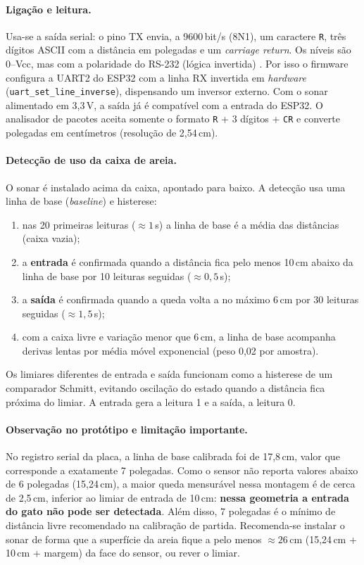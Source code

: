 \paragraph{Ligação e leitura.}
Usa-se a saída serial: o pino TX envia, a 9600\,bit/s (8N1), um caractere \texttt{R}, três dígitos ASCII com a distância em polegadas e um \textit{carriage return}. Os níveis são 0--Vcc, mas com a polaridade do RS-232 (lógica invertida) \citep{maxbotixez1}. Por isso o firmware configura a UART2 do ESP32 \citep{espidfuart} com a linha RX invertida em \textit{hardware} (\texttt{uart\_set\_line\_inverse}), dispensando um inversor externo. Com o sonar alimentado em 3,3\,V, a saída já é compatível com a entrada do ESP32. O analisador de pacotes aceita somente o formato \texttt{R} + 3 dígitos + \texttt{CR} e converte polegadas em centímetros (resolução de 2,54\,cm).

\paragraph{Detecção de uso da caixa de areia.}
O sonar é instalado acima da caixa, apontado para baixo. A detecção usa uma linha de base (\textit{baseline}) e histerese:
\begin{enumerate}
  \item nas 20 primeiras leituras ($\approx 1$\,s) a linha de base é a média das distâncias (caixa vazia);
  \item a \textbf{entrada} é confirmada quando a distância fica pelo menos 10\,cm abaixo da linha de base por 10 leituras seguidas ($\approx 0{,}5$\,s);
  \item a \textbf{saída} é confirmada quando a queda volta a no máximo 6\,cm por 30 leituras seguidas ($\approx 1{,}5$\,s);
  \item com a caixa livre e variação menor que 6\,cm, a linha de base acompanha derivas lentas por média móvel exponencial (peso 0,02 por amostra).
\end{enumerate}
Os limiares diferentes de entrada e saída funcionam como a histerese de um comparador Schmitt, evitando oscilação do estado quando a distância fica próxima do limiar. A entrada gera a leitura 1 e a saída, a leitura 0.

\paragraph{Observação no protótipo e limitação importante.}
No registro serial da placa, a linha de base calibrada foi de 17,8\,cm, valor que corresponde a exatamente 7 polegadas. Como o sensor não reporta valores abaixo de 6 polegadas (15,24\,cm), a maior queda mensurável nessa montagem é de cerca de 2,5\,cm, inferior ao limiar de entrada de 10\,cm: \textbf{nessa geometria a entrada do gato não pode ser detectada}. Além disso, 7 polegadas é o mínimo de distância livre recomendado na calibração de partida. Recomenda-se instalar o sonar de forma que a superfície da areia fique a pelo menos $\approx 26$\,cm (15,24\,cm + 10\,cm + margem) da face do sensor, ou rever o limiar. 

